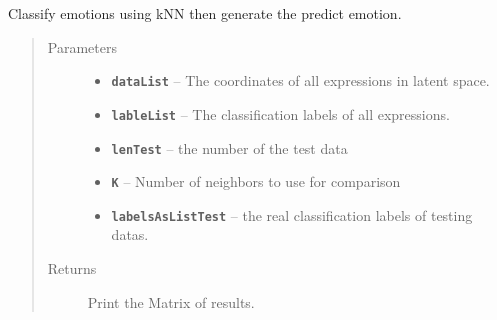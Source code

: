 \documentclass[letterpaper,10pt,english]{sphinxmanual}
\begin{document}
\begin{fulllineitems}
\label{Documentation of Code:classify.knn.predictImage}
Classify emotions using kNN then generate the predict emotion.
\begin{quote}\begin{description}
\item[{Parameters}] \leavevmode\begin{itemize}
\item {} 
\textbf{\texttt{dataList}} -- The coordinates of all expressions in latent space.

\item {} 
\textbf{\texttt{lableList}} -- The classification labels of all expressions.

\item {} 
\textbf{\texttt{lenTest}} -- the number of the test data

\item {} 
\textbf{\texttt{K}} -- Number of neighbors to use for comparison

\item {} 
\textbf{\texttt{labelsAsListTest}} -- the real classification labels of testing datas.

\end{itemize}

\item[{Returns}] \leavevmode
Print the Matrix of results.

\end{description}\end{quote}

\end{fulllineitems}

\end{document}
